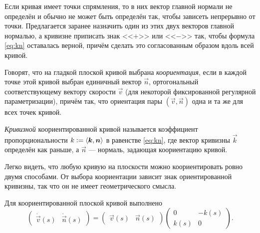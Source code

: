 Если кривая имеет точки спрямления, то в них вектор главной нормали не определён и обычно не может быть определён так, чтобы зависеть непрерывно от точки. Предлагается заранее назначить один из этих двух векторов главной нормалью, а кривизне приписать знак <<$+$>> или <<$-$>> так, чтобы формула \eqref{eq:kn} оставалась верной, причём сделать это согласованным образом вдоль всей кривой.

\begin{definition}
	Говорят, что на гладкой плоской кривой выбрана \textit{коориентация}, если в каждой точке этой кривой выбран единичный вектор $\vec{n}$, ортогональный соответствующему вектору скорости $\vec{v}$ (для некоторой фиксированной регулярной параметризации), причём так, что ориентация пары $(\vec{v}, \vec{n})$ одна и та же для всех точек кривой\footnotemark{}.
\end{definition}


\begin{definition}
	\textit{Кривизной} коориентированной кривой называется коэффициент пропорциональности $k \vcentcolon = \langle\vec{k}, \vec{n}\rangle$ в равенстве \eqref{eq:kn}, где вектор кривизны $\vec{k}$ определён как раньше, а $\vec{n}$ --- нормаль, задающая коориентацию кривой.
\end{definition}

Легко видеть, что любую кривую на плоскости можно коориентировать ровно двумя способами. От выбора коориентации зависит знак ориентированной кривизны, так что он не имеет геометрического смысла.

\begin{theorem}
	Для коориентированной плоской кривой выполнено
	\begin{equation} \label{eq:PlaneFrenet}
		\begin{pmatrix}
			\dot{\vec{v}}(s) & \dot{\vec{n}}(s)
		\end{pmatrix} = 
		\begin{pmatrix}
			\vec{v}(s) & \vec{n}(s)
		\end{pmatrix}
		\begin{pmatrix}
			0 & -k(s)\\
			k(s) & 0
		\end{pmatrix}.
	\end{equation}
\end{theorem}

